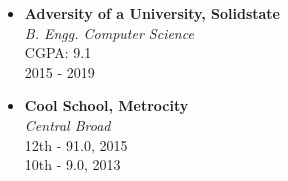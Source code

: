 \begin{itemize}

\item
{\bf Adversity of a University, Solidstate}\\
{\it B. Engg. Computer Science}\\
CGPA: 9.1\\
2015 - 2019

\item
{\bf Cool School, Metrocity}\\
{\it Central Broad}\\
12th - 91.0, 2015\\
10th - 9.0, 2013\\

\end{itemize}

